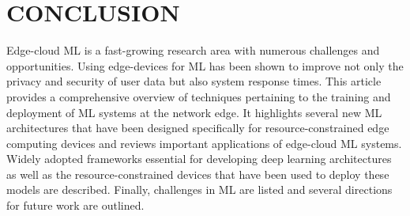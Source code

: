 \documentclass[letterpaper, 10 pt, conference]{ieeeconf}
\begin{document}
\section{CONCLUSION}
Edge-cloud ML is a fast-growing research area with numerous challenges and opportunities. Using edge-devices for ML has been shown to improve not only the privacy and security of user data but also system response times. This article provides a comprehensive overview of techniques pertaining to the training and deployment of ML systems at the network edge. It highlights several new ML architectures that have been designed specifically for resource-constrained edge computing devices and reviews important applications of edge-cloud ML systems. Widely adopted frameworks essential for developing  deep learning architectures as well as the resource-constrained devices that have been used to deploy these models are described. Finally, challenges in  ML are listed and several directions for future work are outlined.

\addtolength{\textheight}{-12cm} 


\end{document}

